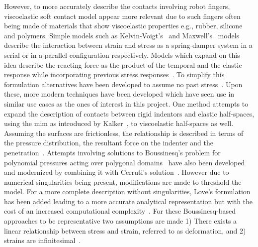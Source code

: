 However, to more accurately describe the contacts involving robot fingers, viscoelastic soft contact model appear more relevant due to such fingers often being made of materials that show viscoelastic properties e.g., rubber, silicone and polymers. Simple models such as  Kelvin-Voigt's~\cite{viscoelasticity} and Maxwell's~\cite{on-the-dynamical-theory-of-gases} models describe the interaction between strain and stress as a spring-damper system in a serial or in a parallel configuration respectively. Models which expand on this idea describe the reacting force as the product of the temporal and the elastic response while incorporating previous stress responses~\cite{mechanical-properties-and-active-remodeling-of-blood-vessels}. To simplify this formulation alternatives have been developed to assume no past stress~\cite{modeling-of-viscoelastic-contacts-and-evolution-of-limit-surface-for-robotic-contact-interface, characteristics-of-contact-and-limit-surface-for-viscoelastic-fingers, effect-of-layer-compliance-on-frictional-behavior-of-soft-robotic-fingers}. Upon these, more modern techniques have been developed which have seen use in similar use cases as the ones of interest in this project. 
One method attempts to expand the description of contacts between rigid indentors and elastic half-spaces, using the \gls{mim} as introduced by Kalker~\cite{on-the-contact-problem-in-elastostatics}, to viscoelastic half-spaces as well. Assuming the surfaces are frictionless, the relationship is described in terms of the pressure distribution, the resultant force on the indenter and the penetration~\cite{a-new-algorithm-for-computing-the-indentation-of-a-rigid-body-of-arbitrary-shape-on-a-viscoelastic-half-space}.
Attempts involving solutions to Boussinesq's problem for polynomial pressures acting over polygonal domains~\cite{a-general-approach-to-the-solution-of-boussinesqs-problem-for-polynomial-pressures-acting-over-polygonal-domains} have also been developed and modernized by combining it with Cerruti's solution~\cite{a-boussinesq-cerruti-solution-set-for-constant-and-linear-distribution-of-normal-and-tangential-load-over-a-triangular-area}. However due to numerical singularities being present, modifications are made to threshold the model. For a more complete description without singularities, Love's formulation has been added leading to a more accurate analytical representation but with the cost of an increased computational complexity~\cite{contact-modelling-and-tactile-data-processing-for-robot-skins}. For these Boussinesq-based approaches to be representative two assumptions are made 1) There exists a linear relationship between stress and strain, referred to as deformation, and 2) strains are infinitesimal~\cite[Chapter 6]{the-linearized-theory-of-elasticity}. \medskip

